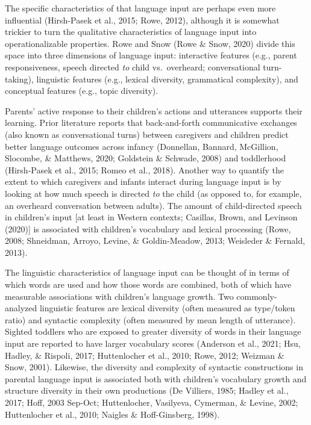 \documentclass[
  man,floatsintext]{apa6}
\begin{document}
The specific characteristics of that language input are perhaps even more influential (Hirsh-Pasek et al., 2015; Rowe, 2012), although it is somewhat trickier to turn the qualitative characteristics of language input into operationalizable properties. Rowe and Snow (Rowe \& Snow, 2020) divide this space into three dimensions of language input: interactive features (e.g., parent responsiveness, speech directed \emph{to} child vs.~overheard; conversational turn-taking), linguistic features (e.g., lexical diversity, grammatical complexity), and conceptual features (e.g., topic diversity).

Parents' active response to their children's actions and utterances supports their learning. Prior literature reports that back-and-forth communicative exchanges (also known as conversational turns) between caregivers and children predict better language outcomes across infancy (Donnellan, Bannard, McGillion, Slocombe, \& Matthews, 2020; Goldstein \& Schwade, 2008) and toddlerhood (Hirsh-Pasek et al., 2015; Romeo et al., 2018). Another way to quantify the extent to which caregivers and infants interact during language input is by looking at how much speech is directed \emph{to} the child (as opposed to, for example, an overheard conversation between adults). The amount of child-directed speech in children's input {[}at least in Western contexts; Casillas, Brown, and Levinson (2020){]} is associated with children's vocabulary and lexical processing (Rowe, 2008; Shneidman, Arroyo, Levine, \& Goldin-Meadow, 2013; Weisleder \& Fernald, 2013).

The linguistic characteristics of language input can be thought of in terms of which words are used and how those words are combined, both of which have measurable associations with children's language growth. Two commonly-analyzed linguistic features are lexical diversity (often measured as type/token ratio) and syntactic complexity (often measured by mean length of utterance). Sighted toddlers who are exposed to greater diversity of words in their language input are reported to have larger vocabulary scores (Anderson et al., 2021; Hsu, Hadley, \& Rispoli, 2017; Huttenlocher et al., 2010; Rowe, 2012; Weizman \& Snow, 2001). Likewise, the diversity and complexity of syntactic constructions in parental language input is associated both with children's vocabulary growth and structure diversity in their own productions (De Villiers, 1985; Hadley et al., 2017; Hoff, 2003 Sep-Oct; Huttenlocher, Vasilyeva, Cymerman, \& Levine, 2002; Huttenlocher et al., 2010; Naigles \& Hoff-Ginsberg, 1998).
\end{document}

